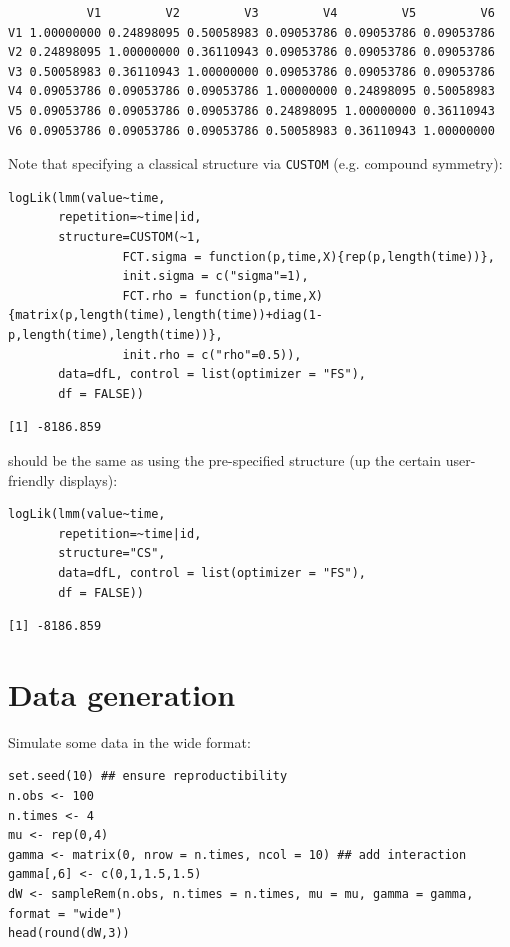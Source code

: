 \documentclass[12pt]{article}
\begin{document}
\begin{verbatim}
           V1         V2         V3         V4         V5         V6
V1 1.00000000 0.24898095 0.50058983 0.09053786 0.09053786 0.09053786
V2 0.24898095 1.00000000 0.36110943 0.09053786 0.09053786 0.09053786
V3 0.50058983 0.36110943 1.00000000 0.09053786 0.09053786 0.09053786
V4 0.09053786 0.09053786 0.09053786 1.00000000 0.24898095 0.50058983
V5 0.09053786 0.09053786 0.09053786 0.24898095 1.00000000 0.36110943
V6 0.09053786 0.09053786 0.09053786 0.50058983 0.36110943 1.00000000
\end{verbatim}


Note that specifying a classical structure via \texttt{CUSTOM} (e.g. compound symmetry):
\lstset{language=r,label= ,caption= ,captionpos=b,numbers=none}
\begin{lstlisting}
logLik(lmm(value~time,
	   repetition=~time|id,
	   structure=CUSTOM(~1,
			    FCT.sigma = function(p,time,X){rep(p,length(time))},
			    init.sigma = c("sigma"=1),
			    FCT.rho = function(p,time,X){matrix(p,length(time),length(time))+diag(1-p,length(time),length(time))},
			    init.rho = c("rho"=0.5)), 
	   data=dfL, control = list(optimizer = "FS"),
	   df = FALSE))
\end{lstlisting}

\begin{verbatim}
[1] -8186.859
\end{verbatim}


should be the same as using the pre-specified structure (up the
certain user-friendly displays):
\lstset{language=r,label= ,caption= ,captionpos=b,numbers=none}
\begin{lstlisting}
logLik(lmm(value~time,
	   repetition=~time|id,
	   structure="CS", 
	   data=dfL, control = list(optimizer = "FS"),
	   df = FALSE))
\end{lstlisting}

\begin{verbatim}
[1] -8186.859
\end{verbatim}


\clearpage

\section{Data generation}
\label{sec:orgcdf7363}
Simulate some data in the wide format:
\lstset{language=r,label= ,caption= ,captionpos=b,numbers=none}
\begin{lstlisting}
set.seed(10) ## ensure reproductibility
n.obs <- 100
n.times <- 4
mu <- rep(0,4)
gamma <- matrix(0, nrow = n.times, ncol = 10) ## add interaction
gamma[,6] <- c(0,1,1.5,1.5)
dW <- sampleRem(n.obs, n.times = n.times, mu = mu, gamma = gamma, format = "wide")
head(round(dW,3))
\end{lstlisting}
\end{document}
